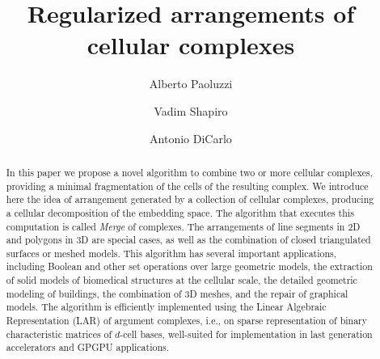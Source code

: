 \documentclass[format=acmsmall, review=false, natbib, screen=true]{acmart}
\begin{document}
\title[Arrangements of cellular complexes]{{Regularized} arrangements of cellular complexes}  
\author{Alberto Paoluzzi}
\author{Vadim Shapiro}
\author{Antonio DiCarlo}

\begin{abstract}
In this paper we propose a novel algorithm to combine two or more cellular complexes, providing a minimal fragmentation of the cells of the resulting complex. We introduce here the idea of arrangement generated by a collection of cellular complexes, producing a cellular decomposition of the embedding space. The algorithm that executes this computation is called \emph{Merge} of complexes. The arrangements of line segments in 2D and polygons in 3D are special cases, as well as the combination of closed triangulated surfaces or meshed models.
This algorithm has several important applications, including Boolean  and other set operations over large geometric models, the extraction of solid models of biomedical structures at the cellular scale, the detailed geometric modeling of buildings, the combination of 3D meshes, and the repair of graphical models. The algorithm is efficiently implemented using  the Linear Algebraic Representation (LAR) of argument complexes, i.e., on sparse representation of binary characteristic matrices of $d$-cell bases, well-suited for implementation in last generation accelerators and GPGPU applications. 
\end{abstract}


%
%
\end{document}
